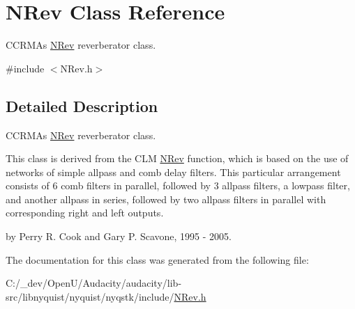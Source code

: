 \hypertarget{class_n_rev}{}\section{N\+Rev Class Reference}
\label{class_n_rev}


C\+C\+R\+MA\textquotesingle{}s \hyperlink{class_n_rev}{N\+Rev} reverberator class.  




{\ttfamily \#include $<$N\+Rev.\+h$>$}



\subsection{Detailed Description}
C\+C\+R\+MA\textquotesingle{}s \hyperlink{class_n_rev}{N\+Rev} reverberator class. 

This class is derived from the C\+LM \hyperlink{class_n_rev}{N\+Rev} function, which is based on the use of networks of simple allpass and comb delay filters. This particular arrangement consists of 6 comb filters in parallel, followed by 3 allpass filters, a lowpass filter, and another allpass in series, followed by two allpass filters in parallel with corresponding right and left outputs.

by Perry R. Cook and Gary P. Scavone, 1995 -\/ 2005. 

The documentation for this class was generated from the following file\+:\begin{DoxyCompactItemize}
\item 
C\+:/\+\_\+dev/\+Open\+U/\+Audacity/audacity/lib-\/src/libnyquist/nyquist/nyqstk/include/\hyperlink{_n_rev_8h}{N\+Rev.\+h}\end{DoxyCompactItemize}
